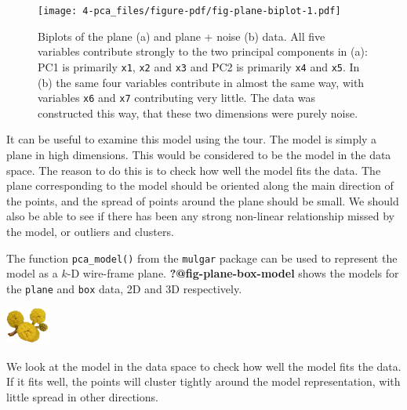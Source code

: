 \documentclass[
  letterpaper,
]{krantz}
\newcommand{\infobox}[1]{%
\noindent\colorbox{info!30}{%
\begin{minipage}{0.98\linewidth}%
    \centering%
    \begin{minipage}[c]{0.15\linewidth} %
      \includegraphics[width=1.5cm]{images/mulga-flowers2.png} %
    \end{minipage}%
    \hfill %
    \begin{minipage}[c]{0.8\linewidth} %
      \bigskip%
      \textsf{#1}%
      \bigskip%
    \end{minipage}%
    \hspace*{3mm}%
  \end{minipage}%
}%
}
\begin{document}
\begin{figure}[H]

{\centering \texttt{[image: 4-pca\_files/figure-pdf/fig-plane-biplot-1.pdf]}

}

\caption{\label{fig-plane-biplot}Biplots of the plane (a) and plane +
noise (b) data. All five variables contribute strongly to the two
principal components in (a): PC1 is primarily \texttt{x1}, \texttt{x2}
and \texttt{x3} and PC2 is primarily \texttt{x4} and \texttt{x5}. In (b)
the same four variables contribute in almost the same way, with
variables \texttt{x6} and \texttt{x7} contributing very little. The data
was constructed this way, that these two dimensions were purely noise.}

\end{figure}

It can be useful to examine this model using the tour. The model is
simply a plane in high dimensions. This would be considered to be the
model in the data space. The reason to do this is to check how well the
model fits the data. The plane corresponding to the model should be
oriented along the main direction of the points, and the spread of
points around the plane should be small. We should also be able to see
if there has been any strong non-linear relationship missed by the
model, or outliers and clusters.

The function \texttt{pca\_model()} from the \texttt{mulgar} package can
be used to represent the model as a \(k\)-D wire-frame plane.
\textbf{?@fig-plane-box-model} shows the models for the \texttt{plane}
and \texttt{box} data, 2D and 3D respectively.

\infobox{We look at the model in the data space to check how well the model fits the data. If it fits well, the points will cluster tightly around the model representation, with little spread in other directions.}
\end{document}
